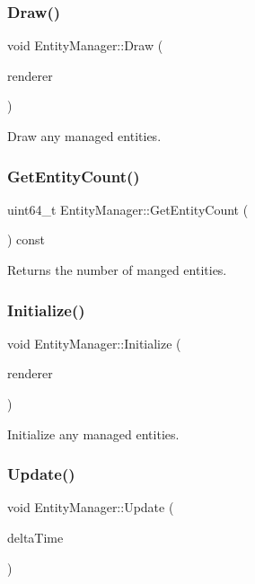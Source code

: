 \subsubsection{\texorpdfstring{Draw()}{Draw()}}
{\footnotesize\ttfamily void Entity\+Manager\+::\+Draw (\begin{DoxyParamCaption}\item[{S\+D\+L\+\_\+\+Renderer $\ast$}]{renderer }\end{DoxyParamCaption})}

Draw any managed entities. \mbox{\label{class_entity_manager_a9657535930969fb7296aa6bb370df1ea}} 
\subsubsection{\texorpdfstring{Get\+Entity\+Count()}{GetEntityCount()}}
{\footnotesize\ttfamily uint64\+\_\+t Entity\+Manager\+::\+Get\+Entity\+Count (\begin{DoxyParamCaption}{ }\end{DoxyParamCaption}) const\hspace{0.3cm}{\ttfamily [inline]}}

Returns the number of manged entities. \mbox{\label{class_entity_manager_a0af35630dea63b0b62b1b03fac453a0f}} 
\subsubsection{\texorpdfstring{Initialize()}{Initialize()}}
{\footnotesize\ttfamily void Entity\+Manager\+::\+Initialize (\begin{DoxyParamCaption}\item[{S\+D\+L\+\_\+\+Renderer $\ast$}]{renderer }\end{DoxyParamCaption})}

Initialize any managed entities. \mbox{\label{class_entity_manager_a29ee635235a8b76bdf10336d70dbf6ed}} 
\subsubsection{\texorpdfstring{Update()}{Update()}}
{\footnotesize\ttfamily void Entity\+Manager\+::\+Update (\begin{DoxyParamCaption}\item[{float}]{delta\+Time }\end{DoxyParamCaption})}

